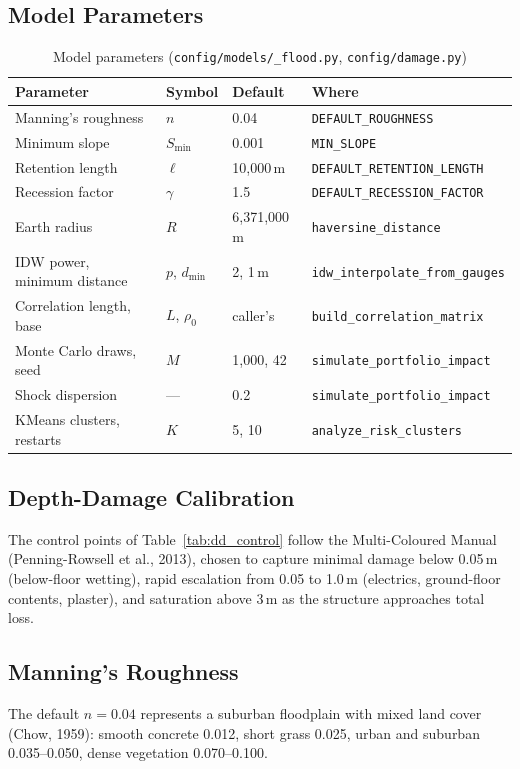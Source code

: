 \documentclass[11pt,a4paper]{article}
\begin{document}
\subsection{Model Parameters}
\begin{table}[H]
\centering
\small
\begin{tabular}{llll}
    \toprule
    \textbf{Parameter} & \textbf{Symbol} & \textbf{Default} & \textbf{Where} \\
    \midrule
    Manning's roughness & $n$ & 0.04 & \texttt{DEFAULT\_ROUGHNESS} \\
    Minimum slope & $S_{\min}$ & 0.001 & \texttt{MIN\_SLOPE} \\
    Retention length & $\ell$ & 10{,}000\,m & \texttt{DEFAULT\_RETENTION\_LENGTH} \\
    Recession factor & $\gamma$ & 1.5 & \texttt{DEFAULT\_RECESSION\_FACTOR} \\
    Earth radius & $R$ & 6{,}371{,}000\,m & \texttt{haversine\_distance} \\
    IDW power, minimum distance & $p$, $d_{\min}$ & 2, 1\,m & \texttt{idw\_interpolate\_from\_gauges} \\
    Correlation length, base & $L$, $\rho_0$ & caller's & \texttt{build\_correlation\_matrix} \\
    Monte Carlo draws, seed & $M$ & 1{,}000, 42 & \texttt{simulate\_portfolio\_impact} \\
    Shock dispersion & --- & 0.2 & \texttt{simulate\_portfolio\_impact} \\
    KMeans clusters, restarts & $K$ & 5, 10 & \texttt{analyze\_risk\_clusters} \\
    \bottomrule
\end{tabular}
\caption{Model parameters (\texttt{config/models/\_flood.py}, \texttt{config/damage.py})}
\label{tab:params}
\end{table}

\subsection{Depth-Damage Calibration}
The control points of Table~\ref{tab:dd_control} follow the Multi-Coloured Manual
(Penning-Rowsell et al., 2013), chosen to capture minimal damage below 0.05\,m
(below-floor wetting), rapid escalation from 0.05 to 1.0\,m (electrics, ground-floor
contents, plaster), and saturation above 3\,m as the structure approaches total loss.

\subsection{Manning's Roughness}
The default $n=0.04$ represents a suburban floodplain with mixed land cover (Chow, 1959):
smooth concrete 0.012, short grass 0.025, urban and suburban 0.035--0.050, dense
vegetation 0.070--0.100.
\end{document}
